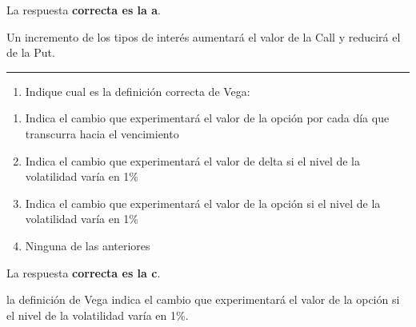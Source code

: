 \documentclass[
  letterpaper,
  DIV=11,
  numbers=noendperiod]{scrreprt}
\providecommand{\tightlist}{%
  \setlength{\itemsep}{0pt}\setlength{\parskip}{0pt}}\usepackage{longtable,booktabs,array}
\begin{document}
\begin{tcolorbox}[enhanced jigsaw, left=2mm, opacityback=0, colback=white, breakable, arc=.35mm, bottomrule=.15mm, rightrule=.15mm, toprule=.15mm, leftrule=.75mm, colframe=quarto-callout-tip-color-frame]
\begin{minipage}[t]{5.5mm}
\textcolor{quarto-callout-tip-color}{\faLightbulb}
\end{minipage}%
\begin{minipage}[t]{\textwidth - 5.5mm}

La respuesta \textbf{correcta es la a}.

Un incremento de los tipos de interés aumentará el valor de la Call y
reducirá el de la Put.

\end{minipage}%
\end{tcolorbox}

\begin{center}\rule{0.5\linewidth}{0.5pt}\end{center}

\begin{enumerate}
\def\labelenumi{\arabic{enumi}.}
\setcounter{enumi}{44}
\tightlist
\item
  Indique cual es la definición correcta de Vega:
\end{enumerate}

\begin{enumerate}
\def\labelenumi{\alph{enumi})}
\item
  Indica el cambio que experimentará el valor de la opción por cada día
  que transcurra hacia el vencimiento
\item
  Indica el cambio que experimentará el valor de delta si el nivel de la
  volatilidad varía en 1\%
\item
  Indica el cambio que experimentará el valor de la opción si el nivel
  de la volatilidad varía en 1\%
\item
  Ninguna de las anteriores
\end{enumerate}

\begin{tcolorbox}[enhanced jigsaw, left=2mm, opacityback=0, colback=white, breakable, arc=.35mm, bottomrule=.15mm, rightrule=.15mm, toprule=.15mm, leftrule=.75mm, colframe=quarto-callout-tip-color-frame]
\begin{minipage}[t]{5.5mm}
\textcolor{quarto-callout-tip-color}{\faLightbulb}
\end{minipage}%
\begin{minipage}[t]{\textwidth - 5.5mm}

La respuesta \textbf{correcta es la c}.

la definición de Vega indica el cambio que experimentará el valor de la
opción si el nivel de la volatilidad varía en 1\%.

\end{minipage}%
\end{tcolorbox}
\end{document}
